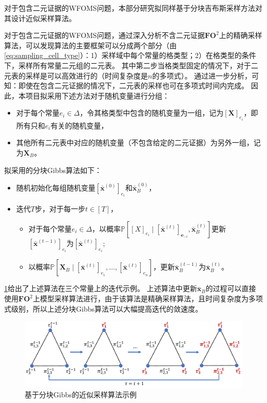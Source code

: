 \documentclass[12pt,UTF8,AutoFakeBold=3,a4paper]{ctexart} %
\newcommand{\domain}{\Delta}
\newcommand{\vecx}{\mathbf{x}}
\newcommand{\pro}{\mathbb{P}}
\begin{document}

对于包含二元证据的WFOMS问题，本部分研究拟同样基于分块吉布斯采样方法对其设计近似采样算法。

对于包含二元证据的WFOMS问题，通过深入分析不含二元证据$\mathbf{FO}^2$上的精确采样算法，可以发现算法的主要框架可以分成两个部分（由\cref{eq:sampling_cell_type}）：1）采样域中每个常量的格类型；2）在格类型的条件下，采样所有常量二元组的二元表。
其中第二步当格类型固定的情况下，对于二元表的采样是可以高效进行的（时间复杂度是$n$的多项式）。
通过进一步分析，可知：即使在包含二元证据的情况下，二元表的采样也可在多项式时间内完成。
因此，本项目拟采用下述方法对于随机变量进行分组：
\begin{itemize}
    \item 对于每个常量$e_i\in\domain$，令其格类型中包含的随机变量为一组，记为$[\mathbf{X}]_{e_i}$，即所有只和$e_i$有关的随机变量，
    \item 其他所有二元表中对应的随机变量（不包含给定的二元证据）为另外一组，记为$\mathbf{X}_{B}$。
\end{itemize}
拟采用的分块Gibbs算法如下：
\begin{itemize}
    \item 随机初始化每组随机变量$[\bar{\vecx}^{(0)}]_{e_i}$和$\bar{\vecx}_B^{(0)}$，
    \item 迭代$T$步，对于每一步$t\in[T]$，
    \begin{itemize}
        \item 对于每个常量$e_i\in\domain$，以概率$\pro\left[[X]_{e_i}\mid [\bar{\vecx}^{(t)}]_{\mathbf{e}_{-i}}, \bar{\vecx}_B^{(t)}\right]$更新$[\bar{\vecx}^{(t-1)}]_{e_i}$为$[\bar{\vecx}^{(t)}]_{e_i}$;
        \item 以概率$\pro\left[\mathbf{X}_B\mid [\bar{\vecx}^{(t)}]_{e_1},\dots,[\bar{\vecx}^{(t)}]_{e_n}\right]$，更新$\bar{\vecx}_B^{(t-1)}$为$\bar{\vecx}_B^{(t)}$。
    \end{itemize}
\end{itemize}
\cref{fig:evidence_gibbs}给出了上述算法在三个常量上的迭代示例。
上述算法中更新$\bar{\vecx}_B$的过程可以直接使用$\mathbf{FO}^2$上模型采样算法进行，由于该算法是精确采样算法，且时间复杂度为多项式级别，所以上述分块Gibbs算法可以大幅提高迭代的敛速度。

\begin{figure}[!htb]
   \centering
   \includegraphics[width=.9\textwidth]{figs/evidence_gibbs.pdf}
   \caption{基于分块Gibbs的近似采样算法示例}
   \label{fig:evidence_gibbs}
\end{figure}
\end{document}

